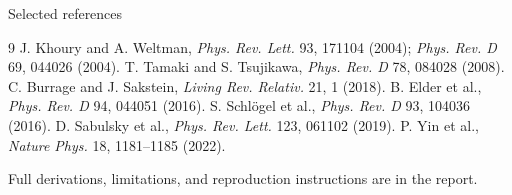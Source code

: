 \documentclass[10pt,aspectratio=169]{beamer}
\begin{document}
\begin{frame}{Selected references}
 \footnotesize
 \begin{thebibliography}{9}
  J. Khoury and A. Weltman, \emph{Phys. Rev. Lett.} 93, 171104 (2004); \emph{Phys. Rev. D} 69, 044026 (2004).
  T. Tamaki and S. Tsujikawa, \emph{Phys. Rev. D} 78, 084028 (2008).
  C. Burrage and J. Sakstein, \emph{Living Rev. Relativ.} 21, 1 (2018).
  B. Elder et al., \emph{Phys. Rev. D} 94, 044051 (2016).
  S. Schl\"ogel et al., \emph{Phys. Rev. D} 93, 104036 (2016).
  D. Sabulsky et al., \emph{Phys. Rev. Lett.} 123, 061102 (2019).
  P. Yin et al., \emph{Nature Phys.} 18, 1181--1185 (2022).
 \end{thebibliography}
 \vfill\scriptsize Full derivations, limitations, and reproduction instructions are in the report.
\end{frame}
\end{document}
